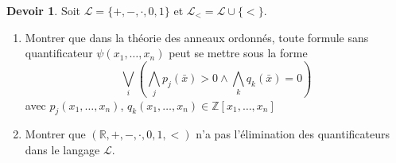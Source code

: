 \documentclass[a4paper, 12pt]{article}
\theoremstyle{definition} \newtheorem{quest}{Question}
\theoremstyle{definition} \newtheorem{dev}[quest]{Devoir}
\begin{document}
\begin{dev}
  Soit $\mathscr{L}= \{+, -, \cdot, 0, 1\}$ et
  $\mathscr{L}_{<} = \mathscr{L}\cup \{<\}$.
  \begin{enumerate}
  \item Montrer que dans la théorie des anneaux ordonnés, toute
    formule sans quantificateur $\psi(x_1, \ldots, x_n)$ peut
    se mettre sous la forme
    \begin{equation}
      \bigvee\limits_i \left (\bigwedge\limits_j p_j(\bar{x}) > 0 \land \bigwedge\limits_k q_k(\bar{x})=0\right)
    \end{equation}
    avec $p_j(x_1, \ldots, x_n)$,
    $q_k(x_1, \ldots, x_n)\in\mathbb Z[x_1, \ldots, x_n]$
  \item Montrer que $(\mathbb R, +, -, \cdot, 0, 1, <)$ n'a pas
    l'élimination des quantificateurs dans le langage $\mathscr L$.
  \end{enumerate}

\end{dev}

\end{document}
